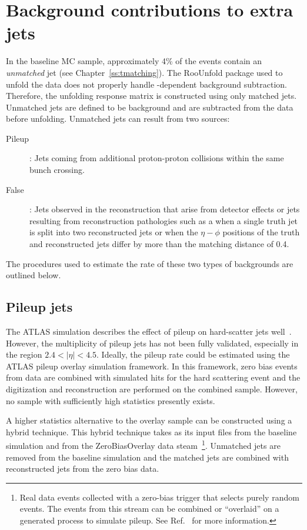 \section{Background contributions to extra jets}
\label{ss:pileup}
In the baseline MC sample, approximately 4\% of the events contain an \textit{unmatched} jet (see Chapter~\ref{ss:tmatching}). The RooUnfold package used to unfold the data does not properly handle \pT-dependent background subtraction. Therefore, the unfolding response matrix is constructed using only matched jets. Unmatched jets are defined to be background and are subtracted from the data before unfolding. 
Unmatched jets can result from two sources: 
\begin{description}
\item[Pileup]: Jets coming from additional proton-proton collisions within the same bunch crossing.
\item[False]: Jets observed in the reconstruction that arise from detector effects or jets resulting from reconstruction pathologies such as a when a single truth jet is split into two reconstructed jets or when the $\eta-\phi$ positions of the truth and reconstructed jets differ by more than the matching distance of 0.4.
\end{description}
The  procedures used to estimate the rate of these two types of backgrounds are outlined below.

\subsection{Pileup jets}


The ATLAS simulation describes the effect of pileup on hard-scatter jets well~\cite{jetpile}. However, the multiplicity of pileup jets has not been fully validated, especially in the region $2.4 <  |\eta| < 4.5$.  Ideally, the pileup rate could be
estimated using the ATLAS pileup overlay simulation framework.  In this framework,
zero bias events from data are combined with simulated hits for the hard scattering event
and the digitization and reconstruction are performed on the combined sample. However,
no sample with sufficiently high statistics presently exists.  

A higher statistics alternative to the overlay sample can be constructed using a hybrid technique.
This hybrid technique takes as its input files 
from the baseline simulation and from the ZeroBiasOverlay data steam~\footnote{Real data events collected with a zero-bias trigger that selects purely random events. The events from this stream can be combined or ``overlaid'' on a generated process to simulate pileup. See Ref.~\cite{minbias} for more information.}.  
Unmatched jets are removed from the baseline simulation
and the matched jets are combined with reconstructed jets from the zero bias data.  

